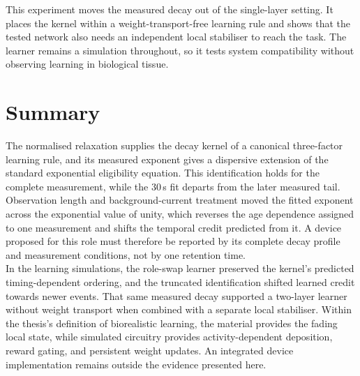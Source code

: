 \noindent This experiment moves the measured decay out of the single-layer setting. It places the kernel within a
weight-transport-free learning rule and shows that the tested network also needs an independent local stabiliser to
reach the task. The learner remains a simulation throughout, so it tests system compatibility without observing
learning in biological tissue.

\FloatBarrier

\section[Summary]{Summary}

\noindent The normalised  relaxation supplies the decay kernel of a canonical three-factor learning rule,
and its measured exponent gives a dispersive extension of the standard exponential eligibility equation. This
identification holds for the complete measurement, while the $30$\,s fit departs from the later measured tail.
Observation length and background-current treatment moved the fitted exponent across the exponential value of unity,
which reverses the age dependence assigned to one measurement and shifts the temporal credit predicted from it. A device
proposed for this role must therefore be reported by its complete decay profile and measurement conditions, not by one
retention time.\\

\noindent In the learning simulations, the role-swap learner preserved the kernel's predicted timing-dependent ordering,
and the truncated identification shifted learned credit towards newer events. That same measured decay supported a
two-layer learner without weight transport when combined with a separate local stabiliser. Within the thesis's
definition of biorealistic learning, the material provides the fading local state,
while simulated circuitry provides activity-dependent deposition, reward gating, and persistent weight updates. An
integrated device implementation remains outside the evidence presented here.
